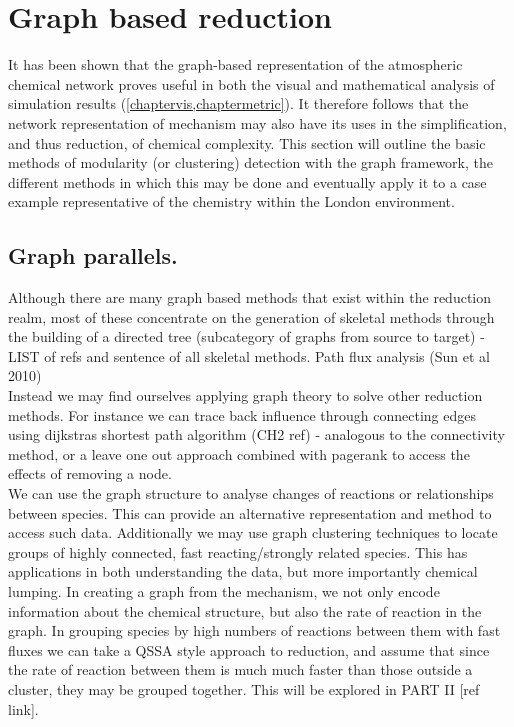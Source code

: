 
\section{Graph based reduction}
It has been shown that the graph-based representation of the atmospheric chemical network proves useful in both the visual and mathematical analysis of simulation results (\autoref{chaptervis,chaptermetric}). It therefore follows that the network representation of mechanism may also have its uses in the simplification, and thus reduction, of chemical complexity.  This section will outline the basic methods of modularity (or clustering) detection with the graph framework, the different methods in which this may be done and eventually apply it to a case example representative of the chemistry within the London environment. 









\subsection{Graph parallels. }
Although there are many graph based methods that exist within the reduction realm, most of these concentrate on the generation of skeletal methods through the building of a directed tree (subcategory of graphs from source to target) - LIST of refs and sentence of all skeletal methods. Path flux analysis (Sun et al 2010)\\

Instead we may find ourselves applying graph theory to solve other reduction methods. For instance we can trace back influence through connecting edges using dijkstras shortest path algorithm (CH2 ref) - analogous to the connectivity method, or a leave one out approach combined with pagerank to access the effects of removing a node.\\

We can use the graph structure to analyse changes of reactions or relationships between species. This can provide an alternative representation and method to access such data. Additionally we may use graph clustering techniques to locate groups of highly connected, fast reacting/strongly related species. This has applications in both understanding the data, but more importantly chemical lumping. In creating a graph from the mechanism, we not only encode information about the chemical structure, but also the rate of reaction in the graph. In grouping species by high numbers of reactions between them with fast fluxes we can take a QSSA style approach to reduction, and assume that since the rate of reaction between them is much much faster than those outside a cluster, they may be grouped together. This will be explored in PART II [ref link].








